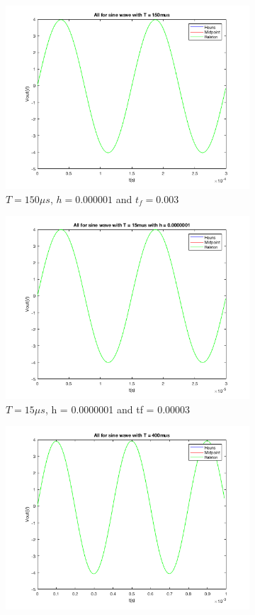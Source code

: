 \documentclass[11pt,a4paper]{article}
\begin{document}
\begin{figure}[h]
\begin{subfigure}{0.5\textwidth}
\centering
\includegraphics[width=.8\linewidth]{Ex1_Figs/allsine150g.png}
\caption{$T = 150\mu s$,  $h = 0.000001$  and $t_f = 0.003$}
\label{fig:sfig1}
\end{subfigure}
\begin{subfigure}{0.5\textwidth}
\centering
\includegraphics[width=.8\linewidth]{Ex1_Figs/allsine15g.png}
\caption{$T = 15\mu s$, h = 0.0000001 and tf = 0.00003}
\label{fig:sfig2}
\end{subfigure}
\begin{subfigure}{.5\textwidth}
\centering
\includegraphics[width=.8\linewidth]{Ex1_Figs/allsine400.png}

\end{subfigure}
\end{figure}
\end{document}
